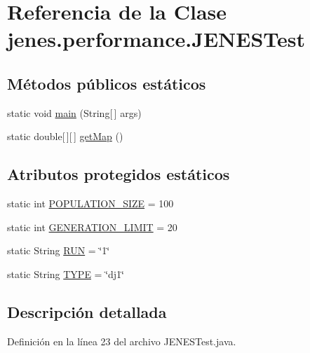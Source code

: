 \hypertarget{classjenes_1_1performance_1_1_j_e_n_e_s_test}{\section{Referencia de la Clase jenes.\-performance.\-J\-E\-N\-E\-S\-Test}
\label{classjenes_1_1performance_1_1_j_e_n_e_s_test}
}
\subsection*{Métodos públicos estáticos}
\begin{DoxyCompactItemize}
\item 
static void \hyperlink{classjenes_1_1performance_1_1_j_e_n_e_s_test_afc2ae43a51b06536b61ff8c256d1a4b5}{main} (String\mbox{[}$\,$\mbox{]} args)
\item 
static double\mbox{[}$\,$\mbox{]}\mbox{[}$\,$\mbox{]} \hyperlink{classjenes_1_1performance_1_1_j_e_n_e_s_test_a7a02a502f510836006a2110099982511}{get\-Map} ()
\end{DoxyCompactItemize}
\subsection*{Atributos protegidos estáticos}
\begin{DoxyCompactItemize}
\item 
static int \hyperlink{classjenes_1_1performance_1_1_j_e_n_e_s_test_abd366eca37794a675c7db2c210b71176}{P\-O\-P\-U\-L\-A\-T\-I\-O\-N\-\_\-\-S\-I\-Z\-E} = 100
\item 
static int \hyperlink{classjenes_1_1performance_1_1_j_e_n_e_s_test_ab2a38cace613491b31f31dcf06b8bf5a}{G\-E\-N\-E\-R\-A\-T\-I\-O\-N\-\_\-\-L\-I\-M\-I\-T} = 20
\item 
static String \hyperlink{classjenes_1_1performance_1_1_j_e_n_e_s_test_a5c84bd75d825c995f6bebb79b45df6c1}{R\-U\-N} = \char`\"{}1\char`\"{}
\item 
static String \hyperlink{classjenes_1_1performance_1_1_j_e_n_e_s_test_a6b35bbf22096ec3923e78d2bc407c2f4}{T\-Y\-P\-E} = \char`\"{}dj1\char`\"{}
\end{DoxyCompactItemize}


\subsection{Descripción detallada}


Definición en la línea 23 del archivo J\-E\-N\-E\-S\-Test.\-java.



